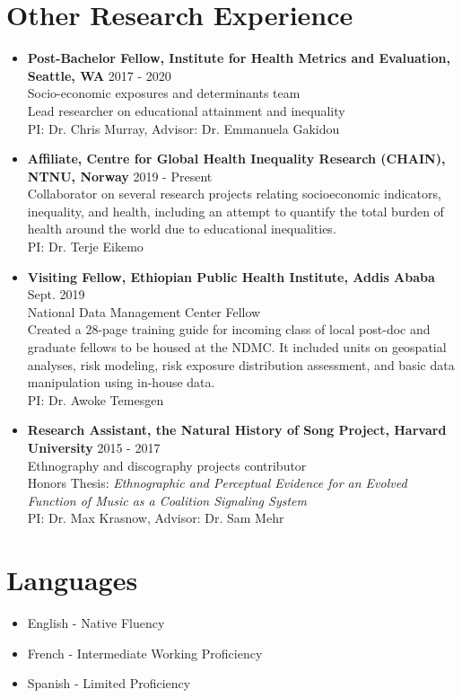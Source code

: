 \documentclass[letterpaper,11pt]{article}
\begin{document}
\section*{Other Research Experience}
\begin{itemize}[leftmargin=*, label={}]
    \item \textbf{Post-Bachelor Fellow, Institute for Health Metrics and Evaluation, Seattle, WA} \hfill 2017 - 2020\\
    Socio-economic exposures and determinants team\\
    Lead researcher on educational attainment and inequality\\
    PI: Dr. Chris Murray, Advisor: Dr. Emmanuela Gakidou
 \item \textbf{Affiliate, Centre for Global Health Inequality Research (CHAIN), NTNU, Norway} \hfill 2019 - Present\\
 Collaborator on several research projects relating socioeconomic indicators, inequality, and
health, including an attempt to quantify the total burden of health around the world due to
educational inequalities.\\
PI: Dr. Terje Eikemo
 \item \textbf{Visiting Fellow, Ethiopian Public Health Institute, Addis Ababa} \hfill Sept. 2019\\
 National Data Management Center Fellow\\
 Created a 28-page training guide for incoming class of local post-doc and graduate fellows to be
housed at the NDMC. It included units on geospatial analyses, risk modeling, risk exposure
distribution assessment, and basic data manipulation using in-house data.\\
PI: Dr. Awoke Temesgen
 \item \textbf{Research Assistant, the Natural History of Song Project, Harvard University} \hfill  2015 - 2017\\
 Ethnography and discography projects contributor\\
 Honors Thesis: \textit{Ethnographic and Perceptual Evidence for an Evolved Function of Music as a
Coalition Signaling System}\\
PI: Dr. Max Krasnow, Advisor: Dr. Sam Mehr

\end{itemize}



\section*{Languages}
\begin{itemize}[leftmargin=*, label={}]

\item English - Native Fluency  
\item French - Intermediate Working Proficiency  
\item Spanish - Limited Proficiency

\end{itemize}
\end{document}
